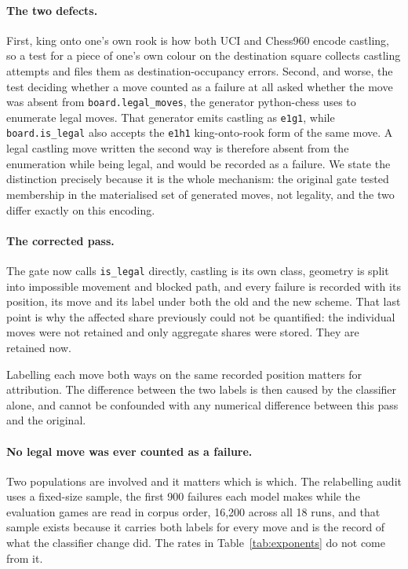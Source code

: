 \documentclass[11pt]{article}
\begin{document}
\paragraph{The two defects.}
First, king onto one's own rook is how both UCI and Chess960 encode castling, so a
test for a piece of one's own colour on the destination square collects castling
attempts and files them as destination-occupancy errors. Second, and worse, the test
deciding whether a move counted as a failure at all asked whether the move was absent
from \texttt{board.legal\_moves}, the generator python-chess uses to enumerate legal
moves. That generator emits castling as \texttt{e1g1}, while \texttt{board.is\_legal} also
accepts the \texttt{e1h1} king-onto-rook form of the same move. A legal castling move
written the second way is therefore absent from the enumeration while being legal, and
would be recorded as a failure. We state the distinction precisely because it is the
whole mechanism: the original gate tested membership in the materialised set of
generated moves, not legality, and the two differ exactly on this encoding.

\paragraph{The corrected pass.}
The gate now calls \texttt{is\_legal} directly, castling is its own class, geometry is
split into impossible movement and blocked path, and every failure is recorded with
its position, its move and its label under both the old and the new scheme. That last
point is why the affected share previously could not be quantified: the individual
moves were not retained and only aggregate shares were stored. They are retained now.

Labelling each move both ways on the same recorded position matters for attribution.
The difference between the two labels is then caused by the classifier alone, and
cannot be confounded with any numerical difference between this pass and the original.

\paragraph{No legal move was ever counted as a failure.}
Two populations are involved and it matters which is which. The relabelling audit
uses a fixed-size sample, the first 900 failures each model makes while the
evaluation games are read in corpus order, 16,200 across all 18 runs, and that
sample exists because it carries both labels for every move and is the record of what
the classifier change did. The rates in Table~\ref{tab:exponents} do not come from it.
\end{document}
